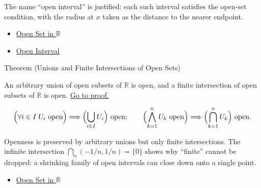 \begin{remark*}[Interpretation]
The name ``open interval'' is justified: each such interval satisfies the open-set condition, with the radius at $x$ taken as the distance to the nearer endpoint.
\end{remark*}
\begin{dependencies}
\begin{itemize}
  \item \hyperref[def:open-set]{Open Set in $\mathbb{R}$}
  \item \hyperref[def:open-interval]{Open Interval}
\end{itemize}
\end{dependencies}
\begin{theorembox}{Theorem (Unions and Finite Intersections of Open Sets)}
\begin{theorem}
\label{thm:open-set-closure-operations}
An arbitrary union of open subsets of $\mathbb{R}$ is open, and a finite intersection of open subsets of $\mathbb{R}$ is open.
\hyperref[prf:open-set-closure-operations]{Go to proof.}
\end{theorem}
\end{theorembox}
\begin{remark*}
\[
\Bigl(\forall i\in I\;U_i\text{ open}\Bigr)\Longrightarrow \Bigl(\bigcup_{i\in I} U_{i}\Bigr) \text{ open};\qquad
\Bigl(\bigwedge_{k=1}^{n} U_k\text{ open}\Bigr)\Longrightarrow \Bigl(\bigcap_{k=1}^{n} U_{k}\Bigr) \text{ open}.
\]
\end{remark*}
\begin{remark*}[Interpretation]
Openness is preserved by arbitrary unions but only finite intersections. The infinite intersection $\bigcap_n(-1/n,1/n)=\{0\}$ shows why ``finite'' cannot be dropped: a shrinking family of open intervals can close down onto a single point.
\end{remark*}
\begin{dependencies}
\begin{itemize}
  \item \hyperref[def:open-set]{Open Set in $\mathbb{R}$}
\end{itemize}
\end{dependencies}
